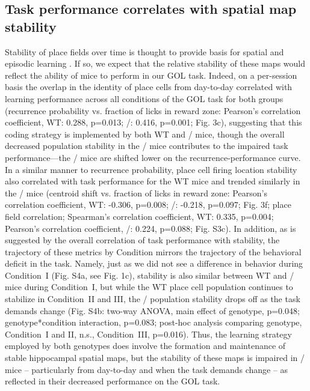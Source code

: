\subsection{Task performance correlates with spatial map stability}

Stability of place fields over time is thought to provide basis for spatial and episodic learning \citep{Kentros2004}\citep{Mankin2012}\citep{Thompson1990}\citep{Ziv2013}. If so, we expect that the relative stability of these maps would reflect the ability of mice to perform in our GOL task. Indeed, on a per-session basis the overlap in the identity of place cells from day-to-day correlated with learning performance across all conditions of the GOL task for both groups (recurrence probability vs. fraction of licks in reward zone: Pearson’s correlation coefficient, WT: 0.288, p=0.013; \df/: 0.416, p=0.001; Fig. 3c), suggesting that this coding strategy is implemented by both WT and \df/ mice, though the overall decreased population stability in the \df/ mice contributes to the impaired task performance—the \df/  mice are shifted lower on the recurrence-performance curve. In a similar manner to recurrence probability, place cell firing location stability also correlated with task performance for the WT mice and trended similarly in the \df/ mice (centroid shift vs. fraction of licks in reward zone: Pearson’s correlation coefficient, WT: -0.306, p=0.008; \df/: -0.218, p=0.097; Fig. 3f; place field correlation; Spearman’s correlation coefficient, WT: 0.335, p=0.004; Pearson’s correlation coefficient, \df/: 0.224, p=0.088; Fig. S3c). In addition, as is suggested by the overall correlation of task performance with stability, the trajectory of these metrics by Condition mirrors the trajectory of the behavioral deficit in the task. Namely, just as we did not see a difference in behavior during Condition~I (Fig. S4a, see Fig. 1c), stability is also similar between WT and \df/  mice during Condition~I, but while the WT place cell population continues to stabilize in Condition~II and III, the \df/ population stability drops off as the task demands change (Fig. S4b: two-way ANOVA, main effect of genotype, p=0.048; genotype*condition interaction, p=0.083; post-hoc analysis comparing genotype, Condition~I and II, n.s., Condition~III, p=0.016). Thus, the learning strategy employed by both genotypes does involve the formation and maintenance of stable hippocampal spatial maps, but the stability of these maps is impaired in \df/ mice – particularly from day-to-day and when the task demands change – as reflected in their decreased performance on the GOL task.

